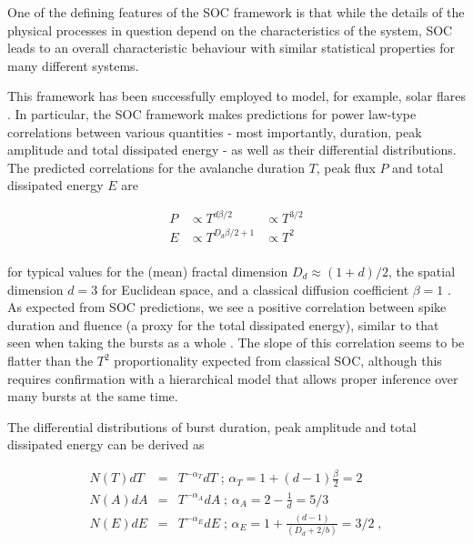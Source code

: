 \documentclass[12pt]{emulateapj}
\begin{document}
One of the defining features of the SOC framework is that while the details of the physical processes in question depend on the characteristics
of the system, SOC leads to an overall characteristic behaviour with similar statistical properties for many different systems. 


 This framework has been successfully employed to model, for example, solar flares \citep[for an overview see ][ and references therein]{aschwanden2014}.
In particular, the SOC framework makes predictions for power law-type correlations between various quantities - most importantly, duration, 
peak amplitude and total dissipated energy -  as well as their differential distributions. 
The predicted correlations for the avalanche duration $T$, peak flux $P$ and total dissipated energy $E$ are

\begin{eqnarray}
P & \propto  T^{d\beta/2} &\propto  T^{3/2} \\ 
E &\propto   T^{D_d\beta/2 + 1} & \propto  T^{2} \\
\end{eqnarray}

for typical values for the (mean) fractal dimension $D_d \approx (1+d)/2$, the spatial dimension $d = 3$ for Euclidean space, and a
classical diffusion coefficient  $\beta = 1$ \citep[see ][ and references therein for details of the derivation]{aschwanden2014}. 
As expected from SOC predictions, we see a positive correlation between spike duration and 
fluence (a proxy for the total dissipated energy), similar to that seen when taking the bursts as a whole \citep{gogus1999}. 
The slope of this correlation seems to be flatter than the $T^{2}$ proportionality
expected from classical SOC, although this requires confirmation with a hierarchical model that allows proper inference over many
bursts at the same time.  

The differential distributions of burst duration, peak amplitude and total dissipated energy can be derived as

\begin{eqnarray}
N(T) dT &=& T^{-\alpha_T}dT \;  \mbox{; $\alpha_T = 1 + (d-1)\frac{\beta}{2}$} = 2\nonumber \\ 
N(A) dA &=& T^{-\alpha_A}dA \; \mbox{; $\alpha_A = 2 - \frac{1}{d}$} = 5/3 \\
N(E) dE & = &T^{-\alpha_E}dE  \;\mbox{; $\alpha_E = 1 + \frac{(d-1)}{(D_d + 2/b)}$} =  3/2 \; ,  \nonumber
\end{eqnarray}
\end{document}

